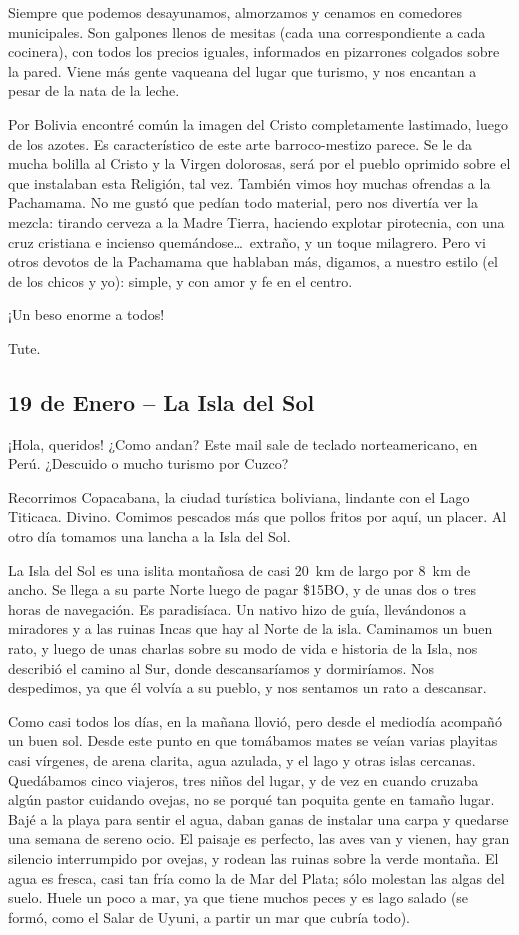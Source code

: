 Siempre que podemos desayunamos, almorzamos y cenamos en comedores municipales.
Son galpones llenos de mesitas (cada una correspondiente a cada cocinera), con
todos los precios iguales, informados en pizarrones colgados sobre la pared.
Viene más gente vaqueana del lugar que turismo, y nos encantan a pesar de la
nata de la leche.

Por Bolivia encontré común la imagen del Cristo completamente lastimado, luego
de los azotes. Es característico de este arte barroco-mestizo parece. Se le da
mucha bolilla al Cristo y la Virgen dolorosas, será por el pueblo oprimido
sobre el que instalaban esta Religión, tal vez. También vimos hoy muchas
ofrendas a la Pachamama. No me gustó que pedían todo material, pero nos
divertía ver la mezcla: tirando cerveza a la Madre Tierra, haciendo explotar
pirotecnia, con una cruz cristiana e incienso quemándose\ldots\ extraño, y un
toque milagrero. Pero vi otros devotos de la Pachamama que hablaban más,
digamos, a nuestro estilo (el de los chicos y yo): simple, y con amor y fe en el
centro.

¡Un beso enorme a todos!

Tute.

\subsection*{19 de Enero -- La Isla del Sol}

¡Hola, queridos! ¿Como andan? Este mail sale de
teclado norteamericano, en Perú. ¿Descuido o mucho turismo por
Cuzco?

Recorrimos Copacabana, la ciudad turística boliviana, lindante con el Lago
Titicaca. Divino. Comimos pescados más que pollos fritos por aquí, un placer.
Al otro día tomamos una lancha a la Isla del Sol.

La Isla del Sol es una islita montañosa de casi 20~km de largo por 8~km de
ancho. Se llega a su parte Norte luego de pagar \$15{\small BO}, y de unas dos o tres
horas de navegación. Es paradisíaca. Un nativo hizo de guía, llevándonos a
miradores y a las ruinas Incas que hay al Norte de la isla. Caminamos un buen
rato, y luego de unas charlas sobre su modo de vida e historia de la Isla, nos
describió el camino al Sur, donde descansaríamos y dormiríamos. Nos
despedimos, ya que él volvía a su pueblo, y nos sentamos un rato a descansar.

Como casi todos los días, en la mañana llovió, pero desde el mediodía
acompañó un buen sol. Desde este punto en que tomábamos mates se veían
varias playitas casi vírgenes, de arena clarita, agua azulada, y el lago y
otras islas cercanas. Quedábamos cinco viajeros, tres niños del lugar, y de
vez en cuando cruzaba algún pastor cuidando ovejas, no se porqué tan poquita
gente en tamaño lugar. Bajé a la playa para sentir el agua, daban ganas de
instalar una carpa y quedarse una semana de sereno ocio. El paisaje es perfecto,
las aves van y vienen, hay gran silencio interrumpido por ovejas, y rodean las
ruinas sobre la verde montaña. El agua es fresca, casi tan fría como la de
Mar del Plata; sólo molestan las algas del suelo. Huele un poco a mar, ya que
tiene muchos peces y es lago salado (se formó, como el Salar de Uyuni, a partir
un mar que cubría todo).

